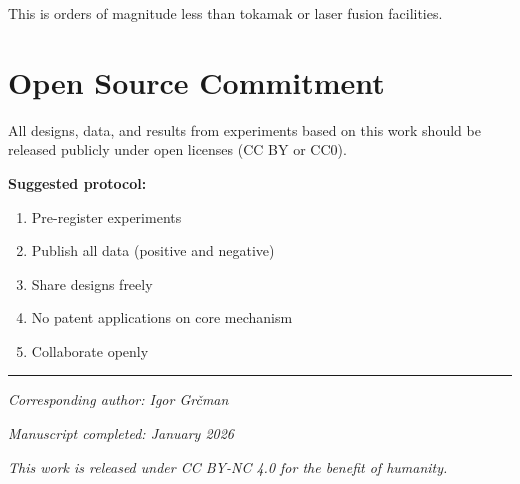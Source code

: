 \documentclass[12pt,a4paper]{article}
\begin{document}
This is orders of magnitude less than tokamak or laser fusion facilities.

\section{Open Source Commitment}

All designs, data, and results from experiments based on this work should be released publicly under open licenses (CC BY or CC0).

\textbf{Suggested protocol:}
\begin{enumerate}
    \item Pre-register experiments
    \item Publish all data (positive and negative)
    \item Share designs freely
    \item No patent applications on core mechanism
    \item Collaborate openly
\end{enumerate}

\vspace{1cm}
\hrule
\vspace{0.5cm}

\noindent\textit{Corresponding author: Igor Grčman}

\noindent\textit{Manuscript completed: January 2026}

\noindent\textit{This work is released under CC BY-NC 4.0 for the benefit of humanity.}

\vspace{1cm}
\end{document}
